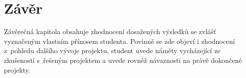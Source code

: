 \documentclass{template/socthesis}
\begin{document}


\newpage
\chapter*{Závěr}

Závěrečná kapitola obsahuje zhodnocení dosažených výsledků se zvlášť vyznačeným vlastním přínosem studenta.
Povinně se zde objeví i zhodnocení z~pohledu dalšího vývoje projektu, student uvede náměty vycházející ze zkušeností s~řešeným projektem a uvede rovněž návaznosti na právě dokončené projekty.

\newpage
\printbibliography[title=Literatura]

\listoffigures
{}

\listoftables
{}

\listoflistedequation
{}
\end{document}
